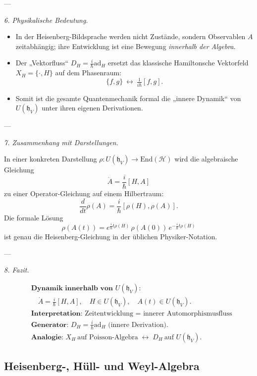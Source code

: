 \documentclass[10pt, letterpaper]{article}
\newcommand{\End}{\mathrm{End}}
\begin{document}
---

\emph{6. Physikalische Bedeutung.}

\begin{itemize}
\item In der Heisenberg-Bildsprache werden nicht Zustände, sondern Observablen \(A\)
      zeitabhängig; ihre Entwicklung ist eine Bewegung \emph{innerhalb der Algebra}.
\item Der „Vektorfluss“ \(D_H=\frac{i}{\hbar}\mathrm{ad}_H\)
      ersetzt das klassische Hamiltonsche Vektorfeld \(X_H=\{\cdot,H\}\)
      auf dem Phasenraum:
      \[
      \{f,g\} \ \leftrightarrow\ \tfrac{1}{i\hbar}[f,g].
      \]
\item Somit ist die gesamte Quantenmechanik formal die „innere Dynamik“ von \(U(\mathfrak{h}_V)\)
      unter ihren eigenen Derivationen.
\end{itemize}

---

\emph{7. Zusammenhang mit Darstellungen.}

In einer konkreten Darstellung \(\rho:U(\mathfrak{h}_V)\to\End(\mathcal{H})\)
wird die algebraische Gleichung
\[
\dot{A} = \frac{i}{\hbar}[H,A]
\]
zu einer Operator-Gleichung auf einem Hilbertraum:
\[
\frac{d}{dt}\rho(A) = \frac{i}{\hbar}[\rho(H),\rho(A)].
\]
Die formale Lösung
\[
\rho(A(t)) = e^{\frac{i}{\hbar}t\rho(H)}\,\rho(A(0))\,e^{-\frac{i}{\hbar}t\rho(H)}
\]
ist genau die Heisenberg-Gleichung in der üblichen Physiker-Notation.

---

\emph{8. Fazit.}

\[
\boxed{
\begin{aligned}
&\textbf{Dynamik innerhalb von } U(\mathfrak{h}_V):\\
&\quad \dot{A} = \tfrac{i}{\hbar}[H,A],\quad H\in U(\mathfrak{h}_V),\quad A(t)\in U(\mathfrak{h}_V).\\[4pt]
&\textbf{Interpretation: } \text{Zeitentwicklung = innerer Automorphismusfluss}\\
&\textbf{Generator: } D_H=\tfrac{i}{\hbar}\mathrm{ad}_H \text{ (innere Derivation)}.\\[4pt]
&\textbf{Analogie: } X_H\ \text{auf Poisson-Algebra} \;\leftrightarrow\; D_H\ \text{auf } U(\mathfrak{h}_V).
\end{aligned}
}
\]

\subsection{Heisenberg-, Hüll- und Weyl-Algebra}
\end{document}
